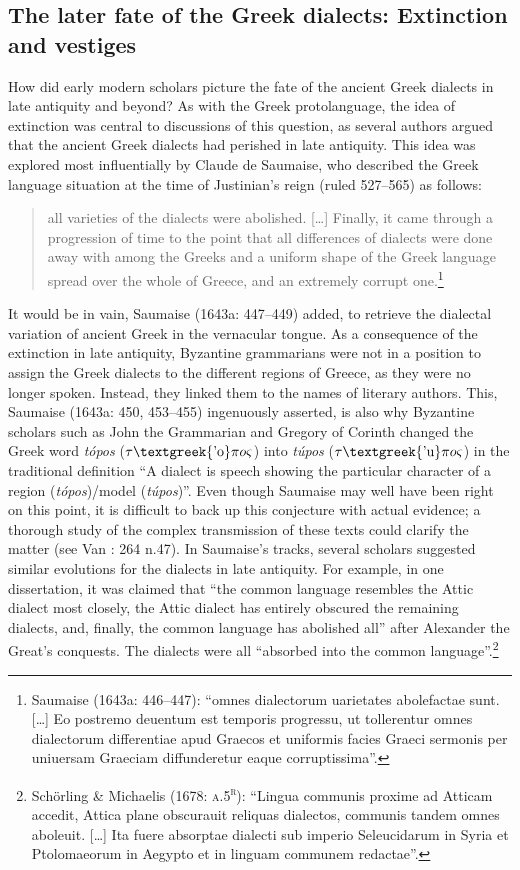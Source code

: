 \documentclass[output=paper]{langsci/langscibook}
\begin{document}
\subsection{The later fate of the Greek dialects: Extinction and vestiges}
\hypertarget{Toc19704839}{}
How did early modern scholars picture the fate of the ancient Greek dialects in late antiquity and beyond? As with the Greek protolanguage, the idea of extinction was central to discussions of this question, as several authors argued that the ancient Greek dialects had perished in late antiquity. This idea was explored most influentially by Claude de Saumaise, who described the Greek language situation at the time of Justinian’s reign (ruled 527–565) as follows:

\begin{quote}
all varieties of the dialects were abolished. […] Finally, it came through a progression of time to the point that all differences of dialects were done away with among the Greeks and a uniform shape of the Greek language spread over the whole of Greece, and an extremely corrupt one.\footnote{Saumaise (1643a: 446–447): “omnes dialectorum uarietates abolefactae sunt. […] Eo postremo deuentum est temporis progressu, ut tollerentur omnes dialectorum differentiae apud Graecos et uniformis facies Graeci sermonis per uniuersam Graeciam diffunderetur eaque corruptissima”.}
\end{quote}

It would be in vain, Saumaise (1643a: 447–449) added, to retrieve the dialectal variation of ancient Greek in the vernacular tongue. As a consequence of the extinction in late antiquity, Byzantine grammarians were not in a position to assign the Greek dialects to the different regions of Greece, as they were no longer spoken. Instead, they linked them to the names of literary authors. This, Saumaise (1643a: 450, 453–455) ingenuously asserted, is also why Byzantine scholars such as John the Grammarian and Gregory of Corinth changed the Greek word \textit{tópos} ($\tau \text{\textgreek{'o}}\pi o\varsigma $) into \textit{túpos} ($\tau \text{\textgreek{'u}}\pi o\varsigma $) in the traditional definition “A dialect is speech showing the particular character of a region (\textit{tópos})/model (\textit{túpos})”. Even though Saumaise may well have been right on this point, it is difficult to back up this conjecture with actual evidence; a thorough study of the complex transmission of these texts could clarify the matter (see Van \citealt{Rooy2016d}: 264 n.47). In Saumaise’s tracks, several scholars suggested similar evolutions for the dialects in late antiquity. For example, in one dissertation, it was claimed that “the common language resembles the Attic dialect most closely, the Attic dialect has entirely obscured the remaining dialects, and, finally, the common language has abolished all” after Alexander the Great’s conquests. The dialects were all “absorbed into the common language”.\footnote{Schörling \& Michaelis (1678: \textsc{a.5}\textsc{\textsuperscript{r}}): “Lingua communis proxime ad Atticam accedit, Attica plane obscurauit reliquas dialectos, communis tandem omnes aboleuit. […] Ita fuere absorptae dialecti sub imperio Seleucidarum in Syria et Ptolomaeorum in Aegypto et in linguam communem redactae”.}
\end{document}

